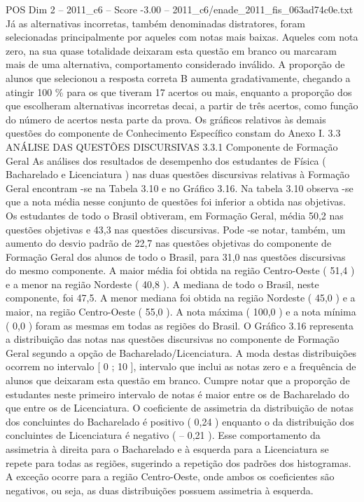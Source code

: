 \begin{textsample}{POS Dim 2 – 2011\_c6 – Score -3.00 – 2011\_c6/enade\_2011\_fis\_063ad74c0e.txt}
Já as alternativas incorretas, também denominadas distratores, foram selecionadas principalmente por aqueles com notas mais baixas.
Aqueles com nota zero, na sua quase totalidade deixaram esta questão em branco ou marcaram mais de uma alternativa, comportamento considerado inválido.
A proporção de alunos que selecionou a resposta correta B aumenta gradativamente, chegando a atingir 100 \% para os que tiveram 17 acertos ou mais, enquanto a proporção dos que escolheram alternativas incorretas decai, a partir de três acertos, como função do número de acertos nesta parte da prova.
Os gráficos relativos às demais questões do componente de Conhecimento Específico constam do Anexo I. 3.3 ANÁLISE DAS QUESTÕES DISCURSIVAS 3.3.1 Componente de Formação Geral As análises dos resultados de desempenho dos estudantes de Física ( Bacharelado e Licenciatura ) nas duas questões discursivas relativas à Formação Geral encontram -se na Tabela 3.10 e no Gráfico 3.16.
Na tabela 3.10 observa -se que a nota média nesse conjunto de questões foi inferior a obtida nas objetivas.
Os estudantes de todo o Brasil obtiveram, em Formação Geral, média 50,2 nas questões objetivas e 43,3 nas questões discursivas.
Pode -se notar, também, um aumento do desvio padrão de 22,7 nas questões objetivas do componente de Formação Geral dos alunos de todo o Brasil, para 31,0 nas questões discursivas do mesmo componente.
A maior média foi obtida na região Centro-Oeste ( 51,4 ) e a menor na região Nordeste ( 40,8 ).
A mediana de todo o Brasil, neste componente, foi 47,5.
A menor mediana foi obtida na região Nordeste ( 45,0 ) e a maior, na região Centro-Oeste ( 55,0 ).
A nota máxima ( 100,0 ) e a nota mínima ( 0,0 ) foram as mesmas em todas as regiões do Brasil.
O Gráfico 3.16 representa a distribuição das notas nas questões discursivas no componente de Formação Geral segundo a opção de Bacharelado/Licenciatura.
A moda destas distribuições ocorrem no intervalo [ 0 ; 10 ], intervalo que inclui as notas zero e a frequência de alunos que deixaram esta questão em branco.
Cumpre notar que a proporção de estudantes neste primeiro intervalo de notas é maior entre os de Bacharelado do que entre os de Licenciatura.
O coeficiente de assimetria da distribuição de notas dos concluintes do Bacharelado é positivo ( 0,24 ) enquanto o da distribuição dos concluintes de Licenciatura é negativo ( – 0,21 ).
Esse comportamento da assimetria à direita para o Bacharelado e à esquerda para a Licenciatura se repete para todas as regiões, sugerindo a repetição dos padrões dos histogramas.
A exceção ocorre para a região Centro-Oeste, onde ambos os coeficientes são negativos, ou seja, as duas distribuições possuem assimetria à esquerda.

\end{textsample}

